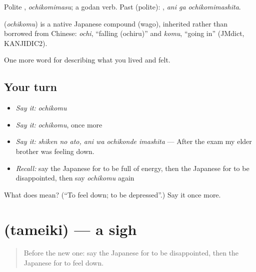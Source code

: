 Polite \textbf{}, \emph{ochikomimasu}; a godan verb. Past (polite): \textbf{ }, \emph{ani ga ochikomimashita}.

\begin{cousinweb}
\textbf{} (\emph{ochikomu}) is a native Japanese compound (wago), inherited rather than borrowed from Chinese: \emph{ochi}, \textquotedblleft{}falling (ochiru)\textquotedblright{} and \emph{komu}, \textquotedblleft{}going in\textquotedblright{} (JMdict, KANJIDIC2).
\end{cousinweb}

\begin{grammarlens}[title={What you've built}]
One more word for describing what you lived and felt.
\end{grammarlens}

\subsection*{Your turn}
\begin{itemize}
\raggedright
  \item \emph{Say it:} \emph{ochikomu}
  \item \emph{Say it:} \emph{ochikomu}, once more
  \item \emph{Say it:} \emph{shiken no ato, ani wa ochikonde imashita} — After the exam my elder brother was feeling down.
  \item \emph{Recall:} say the Japanese for to be full of energy, then the Japanese for to be disappointed, then say \emph{ochikomu} again
\end{itemize}

\begin{tcolorbox}[breakable,colback=teal!4,colframe=teal!35!black,title={Before you move on}]
What does  mean? (\textquotedblleft{}To feel down; to be depressed\textquotedblright{}.) Say it once more.
\end{tcolorbox}
\section[\texorpdfstring{\ja{ためいき} (tameiki)}{ためいき (tameiki)}]{ (tameiki) — a sigh}

\label{lesson:JA-C429-tameiki}



\begin{quote}
Before the new one: say the Japanese for to be disappointed, then the Japanese for to feel down.
\end{quote}

